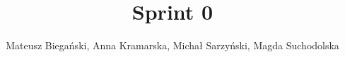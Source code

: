 \documentclass{article}
\begin{document}
\title{Sprint 0}

\author{Mateusz Biegański, Anna Kramarska, Michał Sarzyński, Magda Suchodolska}
\maketitle
\end{document}
